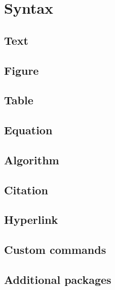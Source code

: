 \section{Syntax}

\subsection{Text}
\subsection{Figure}
\subsection{Table}
\subsection{Equation}
\subsection{Algorithm}
\subsection{Citation}
\subsection{Hyperlink}
\subsection{Custom commands}
\subsection{Additional packages}

\clearpage
